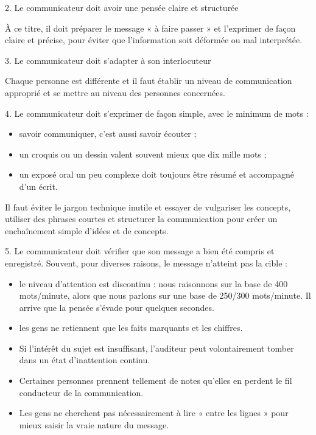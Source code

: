2. Le communicateur doit avoir une pensée claire et structurée
\vspace{0.3cm}

À ce titre, il doit préparer le message « à faire passer » et l’exprimer de façon claire et précise, pour éviter que l’information soit déformée ou mal interprétée.
\vspace{0.3cm} 

3. Le communicateur doit s’adapter à son interlocuteur
\vspace{0.3cm}

Chaque personne est différente et il faut établir un niveau de communication approprié et se mettre au niveau des personnes concernées.
\vspace{0.3cm} 

4. Le communicateur doit s’exprimer de façon simple, avec le minimum de mots :
\vspace{0.3cm}

\begin{itemize}

\item savoir communiquer, c’est aussi savoir écouter ;
\item un croquis ou un dessin valent souvent mieux que dix mille mots ;
\item un exposé oral un peu complexe doit toujours être résumé et accompagné d’un écrit.

\end{itemize}

Il faut éviter le jargon technique inutile et essayer de vulgariser les concepts, utiliser des phrases courtes et structurer la communication pour créer un enchaînement simple d’idées et de concepts.
\vspace{0.3cm}

5. Le communicateur doit vérifier que son message a bien été compris et enregistré.
Souvent, pour diverses raisons, le message n’atteint pas la cible :
\vspace{0.3cm}

\begin{itemize}

\item le niveau d’attention est discontinu : nous raisonnons sur la base de 400 mots/minute, alors que nous parlons sur une base de 250/300 mots/minute. Il arrive que la pensée s’évade pour quelques secondes.
\item les gens ne retiennent que les faits marquants et les chiffres.
\item  Si l’intérêt du sujet est insuffisant, l’auditeur peut volontairement tomber dans un état d’inattention continu.
\item  Certaines personnes prennent tellement de notes qu’elles en perdent le fil conducteur de la communication.
\item  Les gens ne cherchent pas nécessairement à lire « entre les lignes » pour mieux saisir la vraie nature du message.
\end{itemize}

